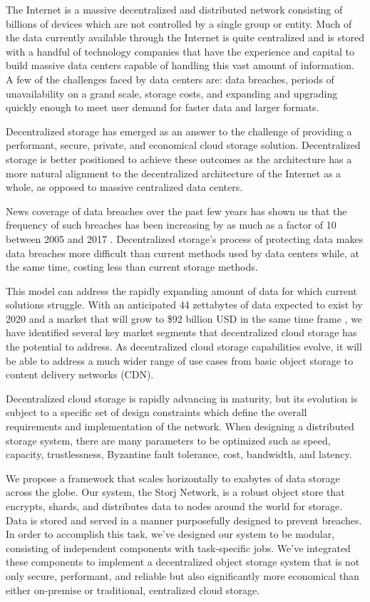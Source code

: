 \documentclass[8pt,fleqn,openany]{book}
\begin{document}
The Internet is a massive decentralized and distributed network consisting of
billions of devices which are not controlled by a single group or entity.
Much of the data currently available through the Internet is quite centralized
and is stored with a handful of technology companies that have the
experience and capital to build massive data centers capable of handling this
vast amount of information.
A few of the challenges faced by data centers are: data breaches, periods of
unavailability on a grand scale, storage costs, and expanding and upgrading quickly enough to meet user demand for faster data and larger formats.

Decentralized storage has emerged as an answer to the challenge of
providing a performant, secure, private, and economical cloud storage solution.
Decentralized storage is better positioned to achieve these outcomes as the
architecture has a more natural alignment to the decentralized architecture of
the Internet as a whole, as opposed to massive centralized data centers.

News coverage of data breaches over the past few years has shown us that the
frequency of such breaches has been increasing by as much as a factor of 10
between 2005 and 2017 \cite{breaches}.
Decentralized storage's process of protecting data makes data breaches more
difficult than current methods used by data centers while, at the same time,
costing less than current storage methods.

This model can address the rapidly
expanding amount of data for which current solutions struggle.
With an anticipated 44 zettabytes of data expected to exist by 2020 and a
market that will grow to \$92 billion USD in the same time frame
\cite{storage-growth}, we have identified several key market segments that decentralized cloud storage
has the potential to address.
As decentralized cloud storage capabilities evolve, it will be able to address a much wider range of use cases from basic
object storage to content delivery networks (CDN).

Decentralized cloud storage is rapidly advancing in maturity, but its evolution
is subject to a specific set of design constraints which
define the overall requirements and implementation of
the network. When designing a distributed storage system,
there are many parameters to be optimized such as speed, capacity,
trustlessness, Byzantine fault tolerance, cost, bandwidth, and latency.

We propose a framework that scales horizontally to exabytes of data storage
across the globe. Our system, the Storj Network, is a robust object store
that encrypts, shards, and distributes data to nodes around the world for
storage.
Data is stored and served in a manner purposefully designed to prevent
breaches.
In order to accomplish this task, we've designed our system to be modular,
consisting of independent components with task-specific jobs.
We've integrated these components to implement a decentralized object storage
system that is not only secure, performant, and reliable but also significantly
more economical than either on-premise or traditional, centralized cloud storage.
\end{document}

